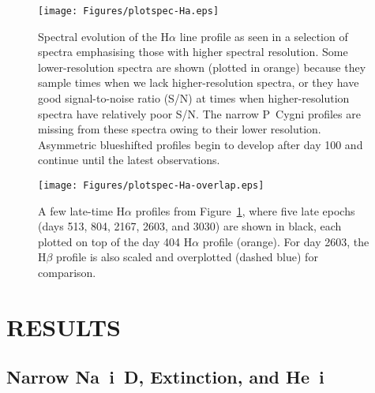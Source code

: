 \documentclass[fleqn,usenatbib,useAMS]{mnras}
\begin{document}
\begin{figure}\begin{center}
\texttt{[image: Figures/plotspec-Ha.eps]}
\end{center}
\caption{Spectral evolution of the H$\alpha$ line profile as seen in a selection of spectra emphasising those with higher spectral resolution.  Some lower-resolution spectra are shown (plotted in orange) because they sample times when we lack higher-resolution spectra, or they have good signal-to-noise ratio (S/N) at times when higher-resolution spectra have relatively poor S/N. The narrow P~Cygni profiles are missing from these spectra owing to their lower resolution.  Asymmetric blueshifted profiles begin to develop after day 100 and continue until the latest observations.}
\label{fig:ha}
\end{figure}

\begin{figure}\begin{center}
\texttt{[image: Figures/plotspec-Ha-overlap.eps]}
\end{center}
\caption{A few late-time H$\alpha$ profiles from Figure~\ref{fig:ha}, where five late epochs (days 513, 804, 2167, 2603, and 3030) are shown in black, each plotted on top of the day 404 H$\alpha$ profile (orange).  For day 2603, the H$\beta$ profile is also scaled and overplotted (dashed blue) for comparison.}
\label{fig:ha.dust}
\end{figure}



\section{RESULTS}\label{results}

\subsection{Narrow Na~{\sc i}~D, Extinction, and He~{\sc i} }
\end{document}
